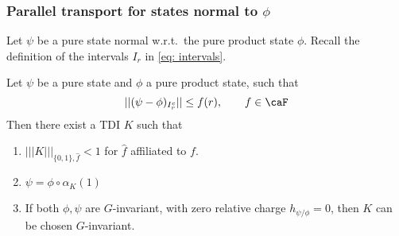 \subsubsection{Parallel transport for states normal to $\phi$}
Let $\psi$ be a pure state normal w.r.t.\ the pure product state $\phi$.
Recall the definition of the intervals $I_r$ in \eqref{eq: intervals}. 
\begin{lemma}\label{lem: parallel transport}
	Let $\psi$ be a  pure state and $\phi$ a pure product state, such that
	\begin{equation}\label{eq: one-sided bounds repeat}
		|| (\psi-\phi)_{I_r^c} || \leq f(r),\qquad f \in \caF
	\end{equation}
	Then there exist a  TDI $K$ such that 
	\begin{enumerate}
		\item   $|||K|||_{\{0,1\},\hat{f}} <1$ for $\hat{f}$ affiliated to $f$.  
		\item $\psi = \phi\circ \alpha_K(1)$
		\item  If both $\phi,\psi$ are $G$-invariant, with zero relative charge $h_{\psi/\phi}=0$, then $K$ can be chosen $G$-invariant.
	\end{enumerate}
\end{lemma}
